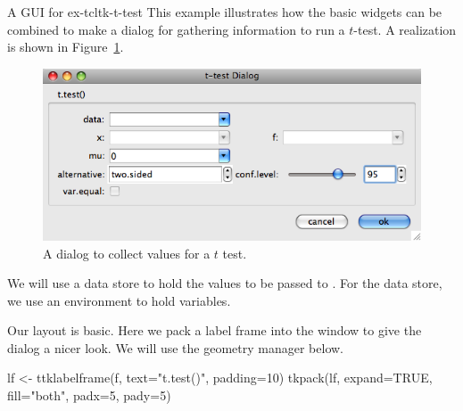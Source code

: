 
\begin{example}{A GUI for }{ex-tcltk-t-test}
This example illustrates how the basic widgets can be combined to make
a dialog for gathering information to run a $t$-test. A realization is shown in Figure~\ref{fig:fig-tcltk-t-test}.

\begin{figure}
  \centering
  \includegraphics[width=.75\textwidth]{fig-tcltk-t-test.png}
  \caption{A dialog to collect values for a $t$ test.}
  \label{fig:fig-tcltk-t-test}
\end{figure}





We will use a data store to hold the values to be passed to
. For the data store, we  use an environment to hold \Tcl\/ variables.

\begin{Schunk}
\end{Schunk}



Our layout is basic. Here we pack a label frame into the window to give the dialog a nicer look.
We will use the  geometry manager below.
\begin{Schunk}
\begin{Sinput}
 lf <- ttklabelframe(f, text="t.test()", padding=10)
 tkpack(lf, expand=TRUE, fill="both", padx=5, pady=5)
\end{Sinput}
\end{Schunk}



\end{example}
